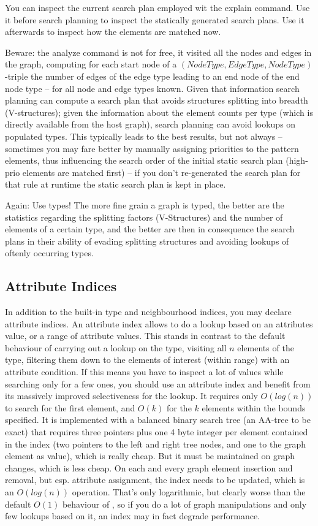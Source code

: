 You can inspect the current search plan employed wit the explain command.
Use it before search planning to inspect the statically generated search plans.
Use it afterwards to inspect how the elements are matched now.

Beware: the analyze command is not for free, it visited all the nodes and edges in the graph, computing for each start node of a $(NodeType, EdgeType, NodeType)$-triple the number of edges of the edge type leading to an end node of the end node type -- for all node and edge types known.
Given that information search planning can compute a search plan that avoids structures splitting into breadth (V-structures);
given the information about the element counts per type (which is directly available from the host graph), 
search planning can avoid lookups on populated types.
This typically leads to the best results, but not always -- sometimes you may fare better by manually assigning priorities to the pattern elements, thus influencing the search order of the initial static search plan (high-prio elements are matched first) -- if you don't re-generated the search plan for that rule at runtime the static search plan is kept in place.

Again: Use types!
The more fine grain a graph is typed, the better are the statistics regarding the splitting factors (V-Structures) and the number of elements of a certain type, and the better are then in consequence the search plans in their ability of evading splitting structures and avoiding lookups of oftenly occurring types.

\subsection{Attribute Indices}
In addition to the built-in type and neighbourhood indices, you may declare attribute indices.
An attribute index allows to do a lookup based on an attributes value, or a range of attribute values.
This stands in contrast to the default behaviour of carrying out a lookup on the type, visiting all $n$ elements of the type, filtering them down to the elements of interest (within range) with an attribute condition.
If this means you have to inspect a lot of values while searching only for a few ones, you should use an attribute index and benefit from its massively improved selectiveness for the lookup.
It requires only $O(log(n))$ to search for the first element, and $O(k)$ for the $k$ elements within the bounds specified.
It is implemented with a balanced binary search tree (an AA-tree\cite{Andersson93balancedsearch} to be exact) that requires three pointers plus one 4 byte integer per element contained in the index (two pointers to the left and right tree nodes, and one to the graph element as value), which is really cheap.
But it must be maintained on graph changes, which is less cheap.
On each and every graph element insertion and removal, but esp. attribute assignment, the index needs to be updated, which is an $O(log(n))$ operation.
That's only logarithmic, but clearly worse than the default $O(1)$ behaviour of \GrG{}, so if you do a lot of graph manipulations and only few lookups based on it, an index may in fact degrade performance.

